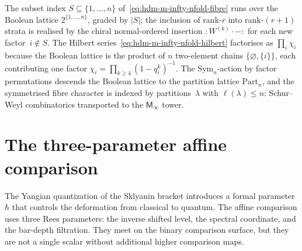 \begin{remark}
\label{rem:hdm-m-infty-nfold-boolean}
The subset index $S\subseteq\{1,\ldots,n\}$
of~\eqref{eq:hdm-m-infty-nfold-fibre} runs over the Boolean lattice
$2^{\{1,\ldots,n\}}$, graded by $|S|$; the inclusion of rank-$r$
into rank-$(r+1)$ strata is realised by the chiral normal-ordered
insertion ${:}W^{(k)}\cdot-{:}$ for each new factor~$i\notin S$. The
Hilbert series~\eqref{eq:hdm-m-infty-nfold-hilbert} factorises as
$\prod_i\chi_i$ because the Boolean lattice is the product of $n$
two-element chains $\{\varnothing,\{i\}\}$, each contributing one
factor $\chi_i=\prod_{k\geq 4}(1-q_i^k)^{-1}$. The
$\mathrm{Sym}_n$-action by factor permutations descends the Boolean
lattice to the partition lattice $\mathrm{Part}_n$, and the
symmetrised fibre character is indexed by partitions~$\lambda$ with
$\ell(\lambda)\leq n$: Schur--Weyl combinatorics transported to the
$\mathsf M_\infty$ tower.
\end{remark}

\section{The three-parameter affine comparison}
\label{sec:hdm-hbar-identification}

The Yangian quantization of the Sklyanin bracket introduces a
formal parameter~$\hbar$ that controls the deformation from
classical to quantum. The affine comparison uses three Rees parameters:
the inverse shifted level, the spectral coordinate, and the bar-depth
filtration. They meet on the binary comparison surface, but they are
not a single scalar without additional higher comparison maps.

